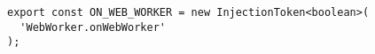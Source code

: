 \begin{verbatim}
export const ON_WEB_WORKER = new InjectionToken<boolean>(
  'WebWorker.onWebWorker'
);
\end{verbatim}
